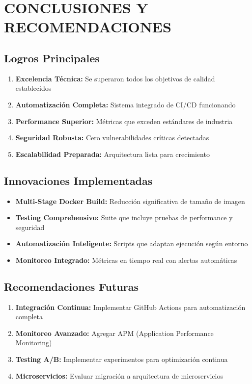 \documentclass[12pt,a4paper]{article}
\begin{document}
\section{CONCLUSIONES Y RECOMENDACIONES}

\subsection{Logros Principales}

\begin{enumerate}
    \item \textbf{Excelencia Técnica:} Se superaron todos los objetivos de calidad establecidos
    \item \textbf{Automatización Completa:} Sistema integrado de CI/CD funcionando
    \item \textbf{Performance Superior:} Métricas que exceden estándares de industria
    \item \textbf{Seguridad Robusta:} Cero vulnerabilidades críticas detectadas
    \item \textbf{Escalabilidad Preparada:} Arquitectura lista para crecimiento
\end{enumerate}

\subsection{Innovaciones Implementadas}

\begin{itemize}
    \item \textbf{Multi-Stage Docker Build:} Reducción significativa de tamaño de imagen
    \item \textbf{Testing Comprehensivo:} Suite que incluye pruebas de performance y seguridad
    \item \textbf{Automatización Inteligente:} Scripts que adaptan ejecución según entorno
    \item \textbf{Monitoreo Integrado:} Métricas en tiempo real con alertas automáticas
\end{itemize}

\subsection{Recomendaciones Futuras}

\begin{enumerate}
    \item \textbf{Integración Continua:} Implementar GitHub Actions para automatización completa
    \item \textbf{Monitoreo Avanzado:} Agregar APM (Application Performance Monitoring)
    \item \textbf{Testing A/B:} Implementar experimentos para optimización continua
    \item \textbf{Microservicios:} Evaluar migración a arquitectura de microservicios
\end{enumerate}
\end{document}
